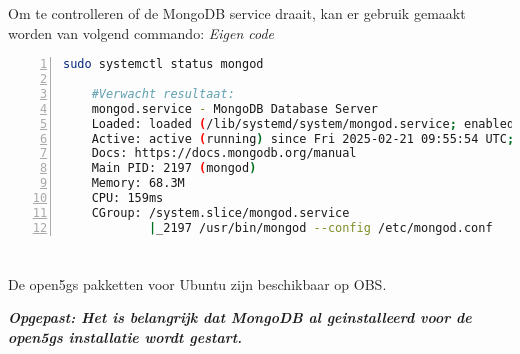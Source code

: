 Om te controlleren of de MongoDB service draait, kan er gebruik gemaakt worden van volgend commando: \textit{Eigen code}



\begin{lstlisting}[basicstyle=\small, frame=single, breaklines=true, postbreak=\mbox{\textcolor{red}{$\hookrightarrow$}\space}, escapeinside ={\%,}, escapechar={!}, numbers=left, language=sh, caption=Controle MongoDB status]
    sudo systemctl status mongod

    #Verwacht resultaat:
    mongod.service - MongoDB Database Server
    Loaded: loaded (/lib/systemd/system/mongod.service; enabled; vendor pr>
    Active: active (running) since Fri 2025-02-21 09:55:54 UTC; 24s ago
    Docs: https://docs.mongodb.org/manual
    Main PID: 2197 (mongod)
    Memory: 68.3M
    CPU: 159ms
    CGroup: /system.slice/mongod.service
            |_2197 /usr/bin/mongod --config /etc/mongod.conf
\end{lstlisting}

\section{}

De \gls{open5gs} pakketten voor Ubuntu zijn beschikbaar op OBS. 

\textit{\textbf{Opgepast: Het is belangrijk dat MongoDB al geinstalleerd voor de \gls{open5gs} installatie wordt gestart.}} \autocite{Lee2025a}


    
